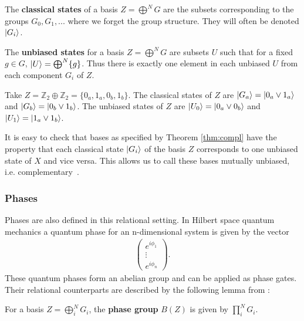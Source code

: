 \begin{corollary}
The \textbf{classical states} of a basis $Z = \bigoplus^{N}G$ are the subsets corresponding to the groups $G_0, G_1,...$ where we forget the group structure. They will often be denoted $| G_i \rangle$.
\end{corollary}

\begin{corollary}
The \textbf{unbiased states} for a basis $Z = \bigoplus^{N}G$ are subsets $U$ such that for a fixed $g\in G$, $| U \rangle = \bigoplus^{N}\{g\}$.
Thus there is exactly one element in each unbiased $U$ from each component $G_i$ of $Z$.
\end{corollary}

\begin{example}
Take $Z = \mathbb{Z}_2\oplus\mathbb{Z}_2=\{0_a,1_a,0_b,1_b\}$. The classical states of $Z$ are $| G_a \rangle=| 0_a\vee1_a \rangle$ and $| G_b \rangle=| 0_b\vee1_b \rangle$.  The unbiased states of $Z$ are $| U_0 \rangle=| 0_a\vee0_b \rangle$ and $| U_1 \rangle=| 1_a\vee1_b \rangle$.
\end{example}

It is easy to check that bases as specified by Theorem \ref{thm:compl} have the property that each classical state $| G_i \rangle$ of the basis $Z$ corresponds to one unbiased state of $X$ and vice versa.
This allows us to call these bases mutually unbiased, i.e. complementary~\cite{evans2009classifying}.
\subsubsection*{Phases}

Phases are also defined in this relational setting.  In Hilbert space quantum mechanics a quantum phase for an n-dimensional system is given by the vector
\begin{align*}
\left(\begin{array}{c}
e^{i\phi_1} \\
\vdots \\
e^{i\phi_n}
\end{array}
\right).
\end{align*}
These quantum phases form an abelian group and can be applied as phase gates.
Their relational counterparts are described by the following lemma from \cite{cqm-notes}:
\begin{lemma}
For a basis $Z=\bigoplus_i^NG_i$, the \textbf{phase group} $B(Z)$ is given by $\prod_i^NG_i$.
\end{lemma}

